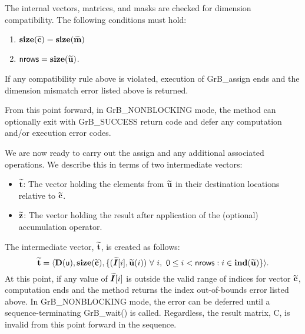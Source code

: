 The internal vectors, matrices, and masks are checked for dimension compatibility. 
The following conditions must hold:
\begin{enumerate}
    \item $\bold{size}({\bf \widetilde{c}}) = \bold{size}({\bf \widetilde{m}})$
    \item ${\sf nrows} = \bold{size}({\bf \widetilde{u}})$.
\end{enumerate}
If any compatibility rule above is violated, execution of {\sf GrB\_assign} ends and 
the dimension mismatch error listed above is returned.

From this point forward, in {\sf GrB\_NONBLOCKING} mode, the method can 
optionally exit with {\sf GrB\_SUCCESS} return code and defer any computation 
and/or execution error codes.

We are now ready to carry out the assign and any additional 
associated operations.  We describe this in terms of two intermediate vectors:
\begin{itemize}
    \item ${\bf \widetilde{t}}$: The vector holding the elements from
    ${\bf \widetilde{u}}$ in their destination locations relative to 
    ${\bf \widetilde{c}}$.

    \item ${\bf \widetilde{z}}$: The vector holding the result after 
    application of the (optional) accumulation operator.
\end{itemize}

The intermediate vector, ${\bf \widetilde{t}}$, is created as follows:
\[
\vector{\widetilde{t}} = \langle
\bold{D}({\sf u}), \bold{size}(\vector{\widetilde{c}}),
\{(\grbarray{\widetilde{I}}[i],\vector{\widetilde{u}}(i))\ \forall \ i, \ 
0 \leq i < {\sf nrows} : i \in \bold{ind}(\vector{\widetilde{u}}) \} \rangle. 
\]
At this point, if any value of $\bm{\widetilde{I}}[i]$ is outside the valid 
range of indices for vector ${\bf \widetilde{c}}$, computation ends and the 
method returns the index out-of-bounds error listed above. In 
{\sf GrB\_NONBLOCKING} mode, the error can be deferred until a 
sequence-terminating {\sf GrB\_wait()} is called.  Regardless, the result 
matrix, {\sf C}, is invalid from this point forward in the 
sequence.

